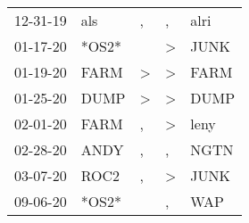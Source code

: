 \begin{supertabular}{lllll}
 12-31-19 &    als &             , &             , &  alri \\
 01-17-20 &  *OS2* &               &  \textgreater &  JUNK \\
 01-19-20 &   FARM &  \textgreater &  \textgreater &  FARM \\
 01-25-20 &   DUMP &  \textgreater &  \textgreater &  DUMP \\
 02-01-20 &   FARM &             , &  \textgreater &  leny \\
 02-28-20 &   ANDY &             , &             , &  NGTN \\
 03-07-20 &   ROC2 &             , &  \textgreater &  JUNK \\
 09-06-20 &  *OS2* &               &             , &   WAP \\
\end{supertabular}
